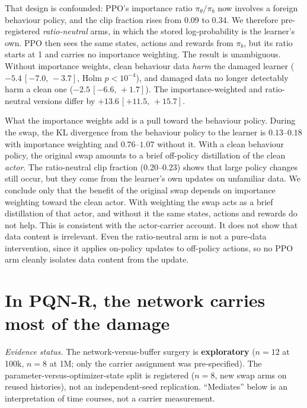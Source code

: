 \documentclass[10pt]{article} %
\newcommand{\ci}[2]{\,[#1,\,#2]}
\begin{document}
That design is confounded: PPO's importance ratio $\pi_\theta/\pi_b$ now involves a foreign behaviour policy, and the clip fraction rises from 0.09 to 0.34. We therefore pre-registered \emph{ratio-neutral} arms, in which the stored log-probability is the learner's own. PPO then sees the same states, actions and rewards from $\pi_b$, but its ratio starts at 1 and carries no importance weighting. The result is unambiguous. Without importance weights, clean behaviour data \emph{harm} the damaged learner ($-5.4\ci{-7.0}{-3.7}$, Holm $p<10^{-4}$), and damaged data no longer detectably harm a clean one ($-2.5\ci{-6.6}{+1.7}$). The importance-weighted and ratio-neutral versions differ by $+13.6\ci{+11.5}{+15.7}$.

What the importance weights add is a pull toward the behaviour policy. During the swap, the KL divergence from the behaviour policy to the learner is $0.13$--$0.18$ with importance weighting and $0.76$--$1.07$ without it. With a clean behaviour policy, the original swap amounts to a brief off-policy distillation of the clean \emph{actor}. The ratio-neutral clip fraction (0.20--0.23) shows that large policy changes still occur, but they come from the learner's own updates on unfamiliar data. We conclude only that the benefit of the original swap depends on importance weighting toward the clean actor. With weighting the swap acts as a brief distillation of that actor, and without it the same states, actions and rewards do not help. This is consistent with the actor-carrier account. It does not show that data content is irrelevant. Even the ratio-neutral arm is not a pure-data intervention, since it applies on-policy updates to off-policy actions, so no PPO arm cleanly isolates data content from the update.

\section{In PQN-R, the network carries most of the damage}\label{sec:pqnr}

\noindent\textit{Evidence status.} The network-versus-buffer surgery is \textbf{exploratory} ($n=12$ at 100k, $n=8$ at 1M; only the carrier assignment was pre-specified). The parameter-versus-optimizer-state split is registered ($n=8$, new swap arms on reused histories), not an independent-seed replication. ``Mediates'' below is an interpretation of time courses, not a carrier measurement.
\end{document}

